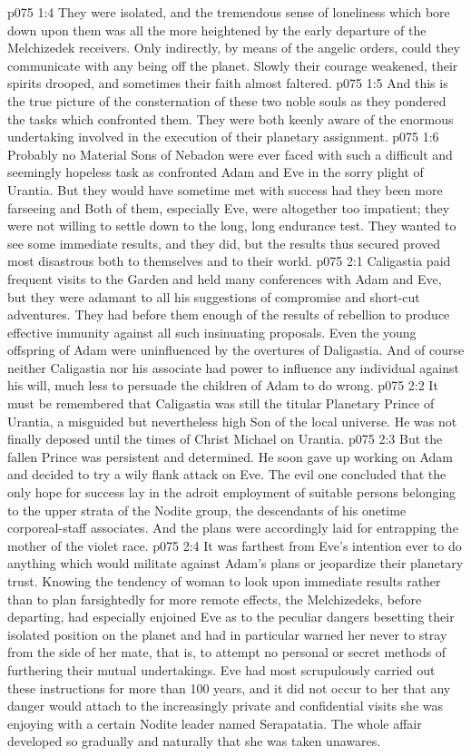 \vs p075 1:4 They were isolated, and the tremendous sense of loneliness which bore down upon them was all the more heightened by the early departure of the Melchizedek receivers. Only indirectly, by means of the angelic orders, could they communicate with any being off the planet. Slowly their courage weakened, their spirits drooped, and sometimes their faith almost faltered.
\vs p075 1:5 And this is the true picture of the consternation of these two noble souls as they pondered the tasks which confronted them. They were both keenly aware of the enormous undertaking involved in the execution of their planetary assignment.
\vs p075 1:6 Probably no Material Sons of Nebadon were ever faced with such a difficult and seemingly hopeless task as confronted Adam and Eve in the sorry plight of Urantia. But they would have sometime met with success had they been more farseeing and  Both of them, especially Eve, were altogether too impatient; they were not willing to settle down to the long, long endurance test. They wanted to see some immediate results, and they did, but the results thus secured proved most disastrous both to themselves and to their world.
\vs p075 2:1 Caligastia paid frequent visits to the Garden and held many conferences with Adam and Eve, but they were adamant to all his suggestions of compromise and short\hyp{}cut adventures. They had before them enough of the results of rebellion to produce effective immunity against all such insinuating proposals. Even the young offspring of Adam were uninfluenced by the overtures of Daligastia. And of course neither Caligastia nor his associate had power to influence any individual against his will, much less to persuade the children of Adam to do wrong.
\vs p075 2:2 It must be remembered that Caligastia was still the titular Planetary Prince of Urantia, a misguided but nevertheless high Son of the local universe. He was not finally deposed until the times of Christ Michael on Urantia.
\vs p075 2:3 But the fallen Prince was persistent and determined. He soon gave up working on Adam and decided to try a wily flank attack on Eve. The evil one concluded that the only hope for success lay in the adroit employment of suitable persons belonging to the upper strata of the Nodite group, the descendants of his onetime corporeal\hyp{}staff associates. And the plans were accordingly laid for entrapping the mother of the violet race.
\vs p075 2:4 \pc It was farthest from Eve’s intention ever to do anything which would militate against Adam’s plans or jeopardize their planetary trust. Knowing the tendency of woman to look upon immediate results rather than to plan farsightedly for more remote effects, the Melchizedeks, before departing, had especially enjoined Eve as to the peculiar dangers besetting their isolated position on the planet and had in particular warned her never to stray from the side of her mate, that is, to attempt no personal or secret methods of furthering their mutual undertakings. Eve had most scrupulously carried out these instructions for more than 100 years, and it did not occur to her that any danger would attach to the increasingly private and confidential visits she was enjoying with a certain Nodite leader named Serapatatia. The whole affair developed so gradually and naturally that she was taken unawares.
